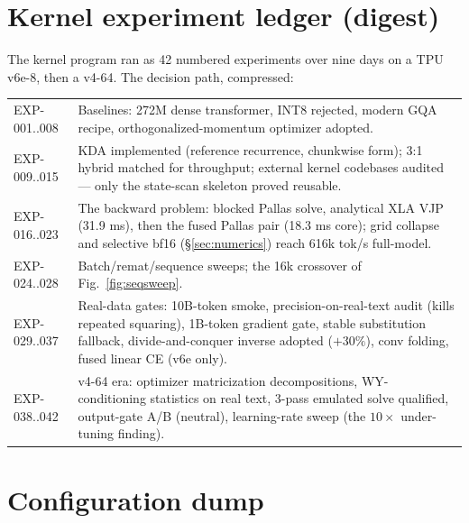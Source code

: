 \section{Kernel experiment ledger (digest)}
\label{app:ledger}

The kernel program ran as 42 numbered experiments over nine days on a
TPU v6e-8, then a v4-64. The decision path, compressed:

\begin{table}[H]
\centering
\small
\begin{tabular}{lp{11cm}}
\toprule
EXP-001..008 & Baselines: 272M dense transformer, INT8 rejected,
modern GQA recipe, orthogonalized-momentum optimizer adopted. \\
EXP-009..015 & KDA implemented (reference recurrence, chunkwise form);
3:1 hybrid matched for throughput; external kernel codebases audited
--- only the state-scan skeleton proved reusable. \\
EXP-016..023 & The backward problem: blocked Pallas solve, analytical
XLA VJP (31.9 ms), then the fused Pallas pair (18.3 ms core); grid
collapse and selective bf16 (\S\ref{sec:numerics}) reach 616k tok/s
full-model. \\
EXP-024..028 & Batch/remat/sequence sweeps; the 16k crossover of
Fig.~\ref{fig:seqsweep}. \\
EXP-029..037 & Real-data gates: 10B-token smoke, precision-on-real-text
audit (kills repeated squaring), 1B-token gradient gate, stable
substitution fallback, divide-and-conquer inverse adopted ($+30\%$),
conv folding, fused linear CE (v6e only). \\
EXP-038..042 & v4-64 era: optimizer matricization decompositions,
WY-conditioning statistics on real text, 3-pass emulated solve
qualified, output-gate A/B (neutral), learning-rate sweep (the
$10\times$ under-tuning finding). \\
\bottomrule
\end{tabular}
\end{table}

\section{Configuration dump}
\label{app:config}

